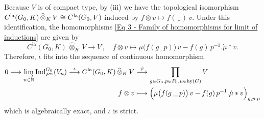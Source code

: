 \documentclass[a4paper, reqno, 10pt]{amsart}
\theoremstyle{definition}
\numberwithin{equation}{section}
\newcommand{\blank}{{\,\_\,}}
\newcommand{\cotimes}[1]{{\,\widehat{\otimes}_{#1}\,}}
\newcommand{\hy}{{\mathrm{hy}}}
\newcommand{\Ind}{{\mathrm{Ind}}}
\newcommand{\la}{{\mathrm{la}}}
\newcommand{\lra}{\longrightarrow}
\newcommand{\lto}{\longmapsto}
\newcommand{\mto}{\mapsto}
\newcommand{\BN}{{\mathbb {N}}}
\begin{document}
Because $V$ is of compact type, by  (iii) we have the topological isomorphism $C^{\rm la}(G_0,K) \cotimes{K} V \cong C^{\rm la}(G_0,V)$ induced by $f\otimes v \mto f(\blank) \, v$.
Under this identification, the homomorphisms \eqref{Eq 3 - Family of homomorphisms for limit of inductions} are given by 
\[C^\la (G_0,K) \cotimes{K} V \lra V \,,\quad f\otimes v \lto \mu \big( f(g\blank p) \big) \, v - f(g) \, p^{-1}.\dot{\mu} \ast v .\]
Therefore, $\iota$ fits into the sequence of continuous homomorphism
\begin{align}\label{Eq 3 - Exact sequence for limit of inductions}
	0 \lra \varinjlim_{n\in \BN} \Ind_{P^n}^{G_0} (V_n) \overset{\iota}{\lra} C^\la (G_0,K) \cotimes{K} V &\overset{\psi}{\lra} \prod_{g\in G_0, p\in P_0 , \mu \in \hy(G)} V\\
	f\otimes v &\lto \Big(\mu \big(f(g \blank p) \big)\, v - f(g) \, p^{-1}.\dot{\mu} \ast v \Big)_{g,p,\mu} \nonumber
\end{align}
which is algebraically exact, and $\iota$ is strict.
\end{document}
